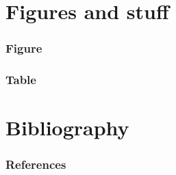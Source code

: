 \documentclass[
	11pt, %
	aspectratio=169, %
]{beamer}
\begin{document}
\section{Figures and stuff}

\begin{frame}
  \frametitle{Figure}

  

\end{frame}

\begin{frame}
  \frametitle{Table}

  

\end{frame}


\section{Bibliography}

\begin{frame}
  \frametitle{References}

\end{frame}
\end{document}
